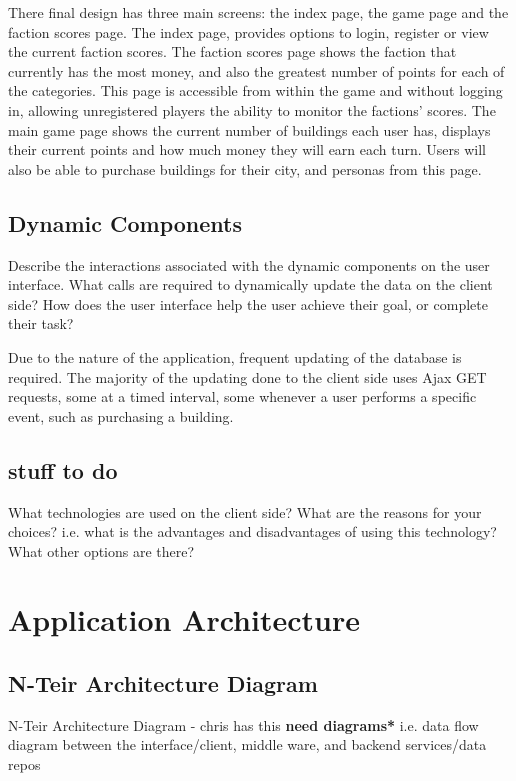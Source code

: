 \documentclass{sig-alt-release2}
\begin{document}
There final design has three main screens: the index page, the game page and the faction scores page. The index  page, provides options to login, register or view the current faction scores. The faction scores page shows the faction that currently has the most money, and also the greatest number of points for each of the categories. This page is accessible from within the game and without logging in, allowing unregistered players the ability to monitor the factions' scores. The main game page shows the current number of buildings each user has, displays their current points and how much money they will earn each turn. Users will also be able to purchase buildings for their city, and personas from this page. 

\subsection{Dynamic Components}

Describe the interactions associated with the dynamic components on the user interface.
What calls are required to dynamically update the data on the client side?
How does the user interface help the user achieve their goal, or complete their task? 

Due to the nature of the application, frequent updating of the database is required. The majority of the updating done to the client side uses Ajax GET requests, some at a timed interval, some whenever a user performs a specific event, such as purchasing a building.

\subsection{stuff to do} 

What technologies are used on the client side? 
What are the reasons for your choices? i.e. what is the advantages and disadvantages of using this technology? 
What other options are there? 

\section{Application Architecture}

\subsection{N-Teir Architecture Diagram}

N-Teir Architecture Diagram - chris has this {\bf *need diagrams*} 
i.e. data flow diagram between the interface/client, middle ware, and backend services/data repos
\end{document}
